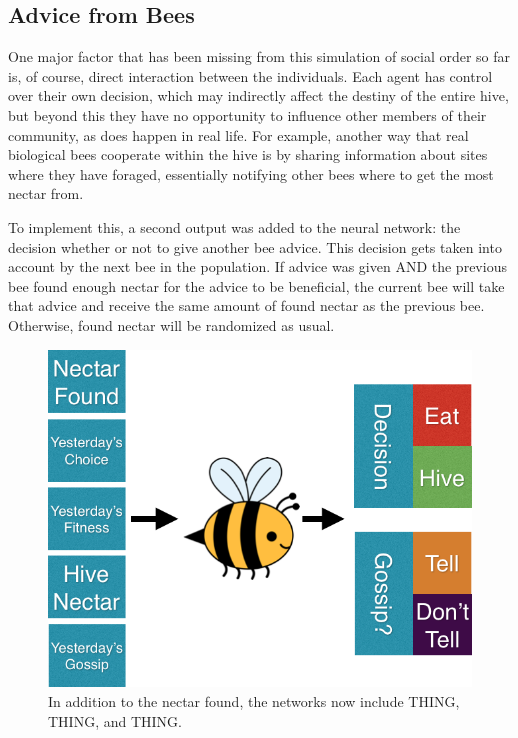 \documentclass[11pt]{article}
\begin{document}

		\subsection{Advice from Bees} %
		\label{sub:advice_from_bees}

			One major factor that has been missing from this simulation of social order so far is, of course, direct interaction between the individuals. Each agent has control over their own decision, which may indirectly affect the destiny of the entire hive, but beyond this they have no opportunity to influence other members of their community, as does happen in real life. For example, another way that real biological bees cooperate within the hive is by sharing information about sites where they have foraged, essentially notifying other bees where to get the most nectar from. 

			To implement this, a second output was added to the neural network: the decision whether or not to give another bee advice. This decision gets taken into account by the next bee in the population. If advice was given AND the previous bee found enough nectar for the advice to be beneficial, the current bee will take that advice and receive the same amount of found nectar as the previous bee. Otherwise, found nectar will be randomized as usual.


			\begin{figure}[tb]
				\begin{center}
					\includegraphics[scale=.5]{bee_diagrams/gossip_system.png}
				\end{center}
				\caption{In addition to the nectar found, the networks now include THING, THING, and THING.}
				\label{fig:gossip_system}
			\end{figure}
\end{document}
